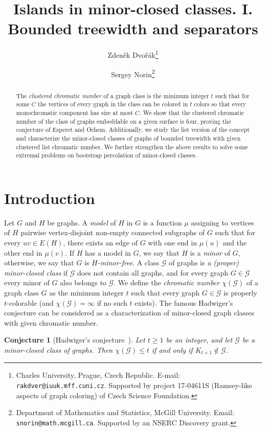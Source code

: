 \documentclass[12pt]{article}
\title{Islands in minor-closed classes. I. Bounded treewidth and separators}
\author{Zden\v{e}k Dvo\v{r}\'ak\thanks{Charles University, Prague, Czech Republic.
E-mail: {\tt rakdver@iuuk.mff.cuni.cz}.  Supported by project 17-04611S (Ramsey-like aspects of graph
coloring) of Czech Science Foundation.}\\
\and Sergey Norin\thanks{Department of Mathematics and Statistics, McGill University. Email: {\tt snorin@math.mcgill.ca}. Supported by an NSERC Discovery grant.}}
\date{}
\newtheorem{conj}[theorem]{Conjecture}
\newcommand{\mc}[1]{\mathcal{#1}}
\begin{document}
\maketitle

\begin{abstract}
The \emph{clustered chromatic number} of a graph class is the minimum integer
$t$ such that for some $C$ the vertices of every graph in the class can be
colored in $t$ colors so that every monochromatic component has size at most
$C$.  We show that the clustered chromatic number of the class of graphs
embeddable on a given surface is four, proving the conjecture of Esperet and
Ochem. Additionally, we study the list version of the concept and
characterize the minor-closed classes of graphs of
bounded treewidth with given clustered list chromatic number. We further strengthen the above results to solve some extremal problems on bootstrap percolation of  minor-closed classes.
\end{abstract}

\section{Introduction}\label{sec-intro}
Let $G$ and $H$ be graphs.  A \emph{model} of $H$ in $G$ is a function $\mu$ assigning to vertices of $H$ pairwise vertex-disjoint
non-empty connected subgraphs of $G$ such that for every $uv\in E(H)$, there exists an edge of $G$ with one end in $\mu(u)$
and the other end in $\mu(v)$.   If $H$ has a model in $G$, we say that $H$ is a \emph{minor} of $G$, otherwise, we say that $G$ is \emph{$H$-minor-free}. A class $\mc{G}$ of graphs is \emph{a (proper) minor-closed class} if $\mc{G}$ does not contain all graphs, and  for every graph $G \in \mc{G}$  every minor of $G$ also belongs to $\mc{G}$. We define the \emph{chromatic number $\chi(\mc{G})$} of a graph class $G$ as the minimum integer $t$ such that every graph $G \in \mc{G}$ is properly $t$-colorable
(and $\chi(\mc{G})=\infty$ if no such $t$ exists). 
The famous Hadwiger's conjecture can be considered as a characterization of minor-closed graph classes with given chromatic number.

\begin{conj}[Hadwiger's conjecture~\cite{Hadwiger}] 
Let $t \geq 1$ be an integer, and let $\mc{G}$ be a minor-closed class of graphs. Then $\chi(\mc{G}) \leq t$ if and only if $K_{t+1} \not \in \mc{G}$.
\end{conj}
\end{document}
